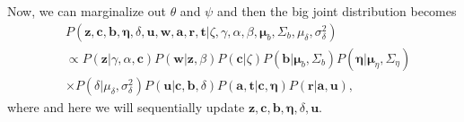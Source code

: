 \documentclass{article}
\begin{document}



Now, we can marginalize out $\theta$ and $\psi$ and then the big joint distribution becomes
\begin{equation}
\begin{aligned}
&P(\boldsymbol{z},\boldsymbol{c}, \boldsymbol{b},\boldsymbol{\eta}, \delta, \boldsymbol{u}, \boldsymbol{w}, \boldsymbol{a}, \boldsymbol{r}, \boldsymbol{t}|\zeta, \gamma, \alpha, \beta, \boldsymbol{\mu}_b, \Sigma_b,\mu_\delta,\sigma^2_\delta)
\\&\propto P(\boldsymbol{z}|\gamma, \alpha, \boldsymbol{c})P(\boldsymbol{w}|\boldsymbol{z}, \beta) P(\boldsymbol{c}|\zeta) P(\boldsymbol{b}|\boldsymbol{\mu}_b, \Sigma_b ) P(\boldsymbol{\eta}|\boldsymbol{\mu}_\eta, \Sigma_\eta )
\\&\times P(\delta|\mu_\delta,\sigma^2_\delta) P(\boldsymbol{u}| \boldsymbol{c},\boldsymbol{b}, \delta) P(\boldsymbol{a}, \boldsymbol{t}|\boldsymbol{c}, \boldsymbol{\eta})P(\boldsymbol{r}|\boldsymbol{a},\boldsymbol{u}),
\end{aligned}
\end{equation}
where 
and here we will sequentially update $\boldsymbol{z},\boldsymbol{c}, \boldsymbol{b},\boldsymbol{\eta}, \delta, \boldsymbol{u}$.
\end{document}
